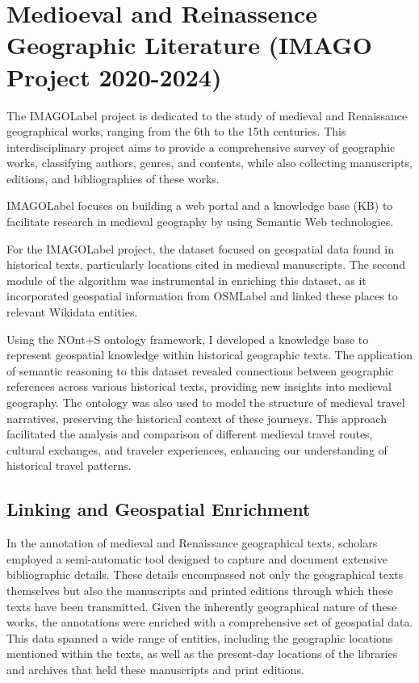 \section{Medioeval and Reinassence Geographic Literature (IMAGO Project 2020-2024)}\label{VII-sec:imago}

The \acrfull{IMAGOLabel} project \cite{IMAGOProject} is dedicated to the study of medieval and Renaissance geographical works, ranging from the 6th to the 15th centuries. This interdisciplinary project aims to provide a comprehensive survey of geographic works, classifying authors, genres, and contents, while also collecting manuscripts, editions, and bibliographies of these works. 

\acrshort{IMAGOLabel} focuses on building a web portal and a knowledge base (KB) to facilitate research in medieval geography by using Semantic Web technologies. 

For the \acrshort{IMAGOLabel} project, the dataset focused on geospatial data found in historical texts, particularly locations cited in medieval manuscripts. The second module of the algorithm was instrumental in enriching this dataset, as it incorporated geospatial information from \acrshort{OSMLabel} and linked these places to relevant Wikidata entities.

Using the NOnt+S ontology framework, I developed a knowledge base to represent geospatial knowledge within historical geographic texts. The application of semantic reasoning to this dataset revealed connections between geographic references across various historical texts, providing new insights into medieval geography. The ontology was also used to model the structure of medieval travel narratives, preserving the historical context of these journeys. This approach facilitated the analysis and comparison of different medieval travel routes, cultural exchanges, and traveler experiences, enhancing our understanding of historical travel patterns.

\subsection{Linking and Geospatial Enrichment}\label{VII-subsec:imago-linking}

In the annotation of medieval and Renaissance geographical texts, scholars employed a semi-automatic tool designed to capture and document extensive bibliographic details. These details encompassed not only the geographical texts themselves but also the manuscripts and printed editions through which these texts have been transmitted. Given the inherently geographical nature of these works, the annotations were enriched with a comprehensive set of geospatial data. This data spanned a wide range of entities, including the geographic locations mentioned within the texts, as well as the present-day locations of the libraries and archives that held these manuscripts and print editions.

